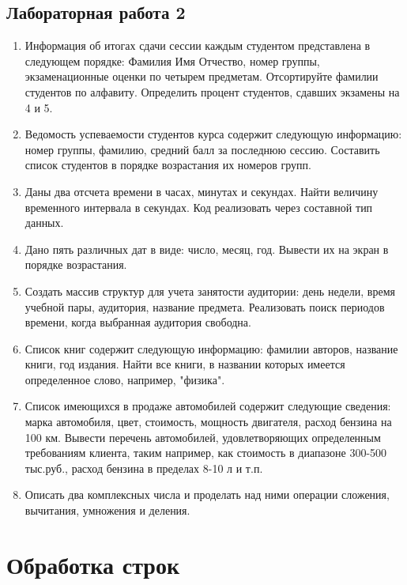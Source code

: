 \subsection{Лабораторная работа 2}
\begin{enumerate}[leftmargin=*]
    \item Информация об итогах сдачи сессии каждым студентом представлена в следующем порядке: Фамилия Имя Отчество, номер группы, экзаменационные оценки по четырем предметам. 
    Отсортируйте фамилии студентов по алфавиту. Определить процент студентов, сдавших экзамены на 4 и 5.
    \item Ведомость успеваемости студентов курса содержит следующую информацию: номер группы, фамилию, средний балл за последнюю сессию. Составить список студентов в порядке возрастания их номеров групп.
    \item Даны два отсчета времени в часах, минутах и секундах. Найти величину временного интервала в секундах. Код реализовать через составной тип данных.
    \item Дано пять различных дат в виде: число, месяц, год. Вывести их на экран в порядке возрастания.
    \item Создать массив структур для учета занятости аудитории: день недели, время учебной пары, аудитория, название предмета. Реализовать поиск периодов времени, когда выбранная аудитория свободна.
    \item Список книг содержит следующую информацию: фамилии авторов, название книги, год издания. Найти все книги, в названии которых имеется определенное слово, например, "физика".
    \item Список имеющихся в продаже автомобилей содержит следующие сведения: марка автомобиля, цвет, стоимость, мощность двигателя, расход бензина на 100 км. Вывести перечень автомобилей, удовлетворяющих определенным требованиям клиента, таким например, как стоимость в диапазоне 300-500 тыс.руб., расход бензина в пределах 8-10 л и т.п.
    \item Описать два комплексных числа и проделать над ними операции сложения, вычитания, умножения и деления.
\end{enumerate}

\section{Обработка строк}
